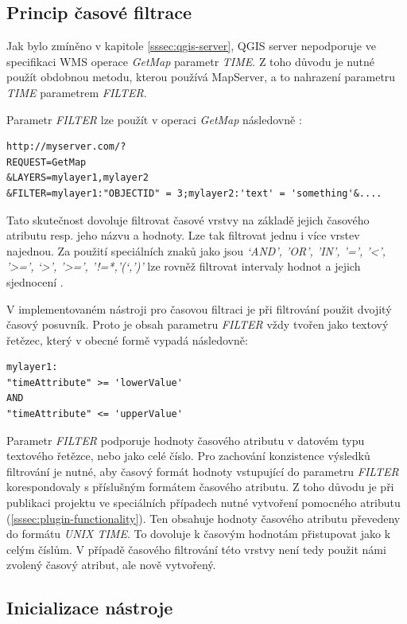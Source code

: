 \subsection{Princip časové filtrace}
\label{sssec:time-filtration}

Jak bylo zmíněno v kapitole \ref{sssec:qgis-server}, QGIS server
nepodporuje ve specifikaci WMS operace \textit{GetMap}
parametr \textit{TIME}. Z toho důvodu je nutné použít obdobnou metodu,
kterou používá MapServer, a to nahrazení parametru \textit{TIME}
parametrem \textit{FILTER}.

\noindent
Parametr \textit{FILTER} lze použít v operaci \textit{GetMap} následovně
\cite{qgis-service}:
\begin{verbatim}
http://myserver.com/?
REQUEST=GetMap
&LAYERS=mylayer1,mylayer2
&FILTER=mylayer1:"OBJECTID" = 3;mylayer2:'text' = 'something'&....
\end{verbatim}

Tato skutečnost dovoluje filtrovat časové vrstvy na základě jejich
časového atributu resp. jeho názvu a hodnoty. Lze tak filtrovat jednu
i více vrstev najednou. Za použití speciálních znaků jako jsou
\textit{‘AND’, ’OR’, ’IN’, ’=’, ’<’, ’>=’,  ‘>’,
’>=’, ’!=*,’(‘,’)’} lze rovněž filtrovat intervaly hodnot
a jejich sjednocení \cite{qgis-service}.

V implementovaném nástroji pro časovou filtraci je při filtrování použit
dvojitý časový posuvník. Proto je obsah parametru \textit{FILTER} vždy
tvořen jako textový řetězec, který v obecné formě vypadá následovně:

\begin{verbatim}
mylayer1:
"timeAttribute" >= 'lowerValue'
AND
"timeAttribute" <= 'upperValue'
\end{verbatim}

Parametr \textit{FILTER} podporuje hodnoty časového atributu v datovém
typu textového řetězce, nebo jako celé číslo. Pro zachování
konzistence výsledků filtrování je nutné, aby časový formát hodnoty
vstupující do parametru \textit{FILTER} korespondovaly s příslušným
formátem časového atributu. Z toho důvodu je při publikaci projektu
ve speciálních případech nutné vytvoření pomocného atributu
(\ref{sssec:plugin-functionality}). Ten obsahuje hodnoty časového atributu
převedeny do formátu \textit{UNIX TIME}. To dovoluje k časovým hodnotám
přistupovat jako k celým číslům. V případě časového filtrování
této vrstvy není tedy použit námi zvolený časový atribut, ale nově
vytvořený.

\subsection{Inicializace nástroje}
\label{sssec:initialization}

